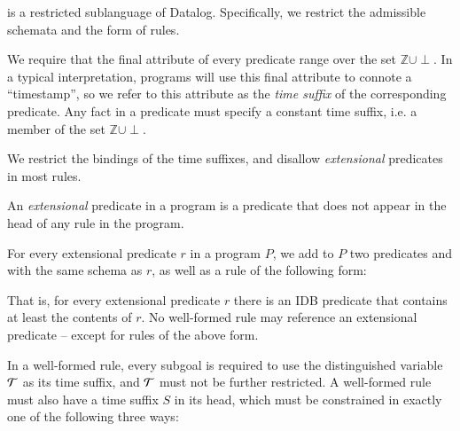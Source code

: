 \lang is a restricted sublanguage of Datalog.  Specifically, we
restrict the admissible schemata and the form of rules.

We require that the final attribute of every \lang
predicate range over the set $\mathbb{Z} \cup \perp$.  In a typical
interpretation, \lang programs will use this final attribute to connote a
``timestamp'', so we refer to this attribute as the \emph{time suffix} of the
corresponding predicate.  Any fact in a \lang predicate must specify a
constant time suffix, i.e. a member of the set $\mathbb{Z} \cup \perp$.

We restrict the bindings of the time suffixes, and
disallow {\em extensional} predicates in most rules.



\begin{definition}
%
An \emph{extensional} predicate in a \lang program is a predicate
that does not appear in the head of any rule in the program.  
%
\end{definition}


For every extensional predicate $r$ in a \lang program $P$, we add to $P$ two
predicates  and  with the same schema as $r$, as well as a rule
of the following form:


That is, for every extensional predicate $r$ there is an IDB predicate  that
contains at least the contents of $r$.  No well-formed \lang rule may reference
an extensional predicate -- except for rules of the above
form.~

In a well-formed \lang rule, every subgoal is required to use the
distinguished variable $\Tau$ as its time suffix, and $\Tau$ must not be
further restricted.  A well-formed \lang rule must also have a time suffix
$S$ in its head, which must be constrained in exactly one of the following
three ways:

